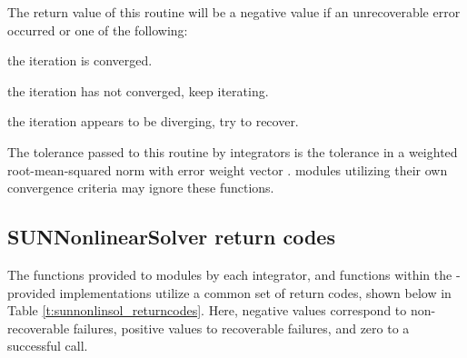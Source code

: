 {
  The return value of this routine will be a negative value if an unrecoverable
  error occurred or one of the following:
  \begin{args}
  \item[\id{SUN\_NLS\_SUCCESS}]
    the iteration is converged.
  \item[\id{SUN\_NLS\_CONTINUE}]
    the iteration has not converged, keep iterating.
  \item[\id{SUN\_NLS\_CONV\_RECVR}]
    the iteration appears to be diverging, try to recover.
  \end{args}
}
{
  The tolerance passed to this routine by {\sundials} integrators is the
  tolerance in a weighted root-mean-squared norm with error weight
  vector . {\sunnonlinsol} modules utilizing their own convergence
  criteria may ignore these functions.
}


\subsection{SUNNonlinearSolver return codes}
\label{ss:sunnonlinsol_returncodes}

The functions provided to {\sunnonlinsol} modules by each {\sundials}
integrator, and functions within the {\sundials}-provided {\sunnonlinsol}
implementations utilize a common set of return codes, shown below in
Table \ref{t:sunnonlinsol_returncodes}.  Here, negative values
correspond to non-recoverable failures, positive values to recoverable
failures, and zero to a successful call.

\newlength{\ColumnOneA}
\newlength{\ColumnTwoA}
\newlength{\ColumnThreeA}
\setlength{\ColumnThreeA}{\textwidth}
\addtolength{\ColumnThreeA}{-0.5in}
\addtolength{\ColumnThreeA}{-\ColumnOneA}
\addtolength{\ColumnThreeA}{-\ColumnTwoA}

